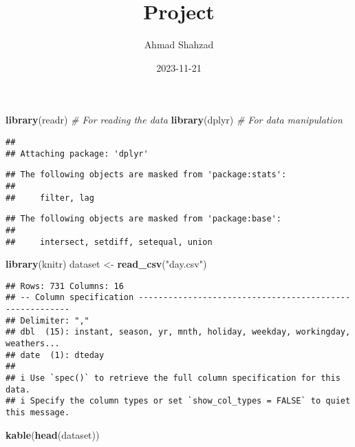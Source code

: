 \documentclass[
]{article}
\title{Project}
\author{Ahmad Shahzad}
\date{2023-11-21}
\newenvironment{Shaded}{\begin{snugshade}}{\end{snugshade}}
\newcommand{\CommentTok}[1]{\textcolor[rgb]{0.56,0.35,0.01}{\textit{#1}}}
\newcommand{\FunctionTok}[1]{\textcolor[rgb]{0.13,0.29,0.53}{\textbf{#1}}}
\newcommand{\NormalTok}[1]{#1}
\newcommand{\OtherTok}[1]{\textcolor[rgb]{0.56,0.35,0.01}{#1}}
\newcommand{\StringTok}[1]{\textcolor[rgb]{0.31,0.60,0.02}{#1}}
\begin{document}
\maketitle

\begin{Shaded}
\begin{Highlighting}[]
\FunctionTok{library}\NormalTok{(readr)   }\CommentTok{\# For reading the data}
\FunctionTok{library}\NormalTok{(dplyr)   }\CommentTok{\# For data manipulation}
\end{Highlighting}
\end{Shaded}

\begin{verbatim}
## 
## Attaching package: 'dplyr'
\end{verbatim}

\begin{verbatim}
## The following objects are masked from 'package:stats':
## 
##     filter, lag
\end{verbatim}

\begin{verbatim}
## The following objects are masked from 'package:base':
## 
##     intersect, setdiff, setequal, union
\end{verbatim}

\begin{Shaded}
\begin{Highlighting}[]
\FunctionTok{library}\NormalTok{(knitr)}
\NormalTok{dataset }\OtherTok{\textless{}{-}} \FunctionTok{read\_csv}\NormalTok{(}\StringTok{"day.csv"}\NormalTok{)}
\end{Highlighting}
\end{Shaded}

\begin{verbatim}
## Rows: 731 Columns: 16
## -- Column specification --------------------------------------------------------
## Delimiter: ","
## dbl  (15): instant, season, yr, mnth, holiday, weekday, workingday, weathers...
## date  (1): dteday
## 
## i Use `spec()` to retrieve the full column specification for this data.
## i Specify the column types or set `show_col_types = FALSE` to quiet this message.
\end{verbatim}

\begin{Shaded}
\begin{Highlighting}[]
\FunctionTok{kable}\NormalTok{(}\FunctionTok{head}\NormalTok{(dataset))}
\end{Highlighting}
\end{Shaded}
\end{document}
